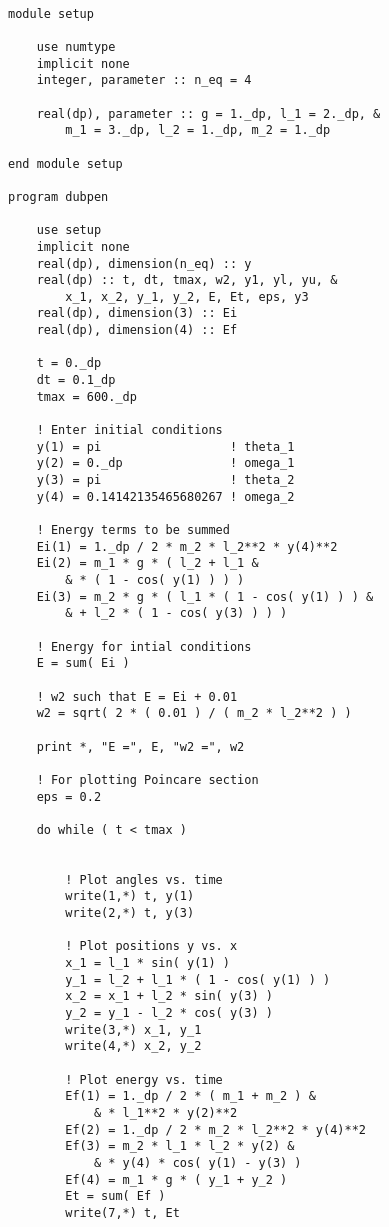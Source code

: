 \documentclass[12pt]{article}
\begin{document}
\begin{lstlisting}[frame=single,caption={The Program {\tt dubpen.f90}.},label=dubpen]

module setup

    use numtype
    implicit none
    integer, parameter :: n_eq = 4

    real(dp), parameter :: g = 1._dp, l_1 = 2._dp, &
        m_1 = 3._dp, l_2 = 1._dp, m_2 = 1._dp

end module setup

program dubpen

    use setup
    implicit none
    real(dp), dimension(n_eq) :: y
    real(dp) :: t, dt, tmax, w2, y1, yl, yu, &
        x_1, x_2, y_1, y_2, E, Et, eps, y3
    real(dp), dimension(3) :: Ei
    real(dp), dimension(4) :: Ef

    t = 0._dp
    dt = 0.1_dp
    tmax = 600._dp

    ! Enter initial conditions
    y(1) = pi                  ! theta_1
    y(2) = 0._dp               ! omega_1
    y(3) = pi                  ! theta_2
    y(4) = 0.14142135465680267 ! omega_2

    ! Energy terms to be summed
    Ei(1) = 1._dp / 2 * m_2 * l_2**2 * y(4)**2
    Ei(2) = m_1 * g * ( l_2 + l_1 &
        & * ( 1 - cos( y(1) ) ) )
    Ei(3) = m_2 * g * ( l_1 * ( 1 - cos( y(1) ) ) &
        & + l_2 * ( 1 - cos( y(3) ) ) )

    ! Energy for intial conditions
    E = sum( Ei )

    ! w2 such that E = Ei + 0.01
    w2 = sqrt( 2 * ( 0.01 ) / ( m_2 * l_2**2 ) )

    print *, "E =", E, "w2 =", w2

    ! For plotting Poincare section
    eps = 0.2

    do while ( t < tmax )


        ! Plot angles vs. time
        write(1,*) t, y(1)
        write(2,*) t, y(3) 

        ! Plot positions y vs. x
        x_1 = l_1 * sin( y(1) )
        y_1 = l_2 + l_1 * ( 1 - cos( y(1) ) )
        x_2 = x_1 + l_2 * sin( y(3) )
        y_2 = y_1 - l_2 * cos( y(3) )
        write(3,*) x_1, y_1 
        write(4,*) x_2, y_2 

        ! Plot energy vs. time
        Ef(1) = 1._dp / 2 * ( m_1 + m_2 ) &
            & * l_1**2 * y(2)**2
        Ef(2) = 1._dp / 2 * m_2 * l_2**2 * y(4)**2
        Ef(3) = m_2 * l_1 * l_2 * y(2) &
            & * y(4) * cos( y(1) - y(3) )
        Ef(4) = m_1 * g * ( y_1 + y_2 )
        Et = sum( Ef )
        write(7,*) t, Et


\end{lstlisting}
\end{document}
